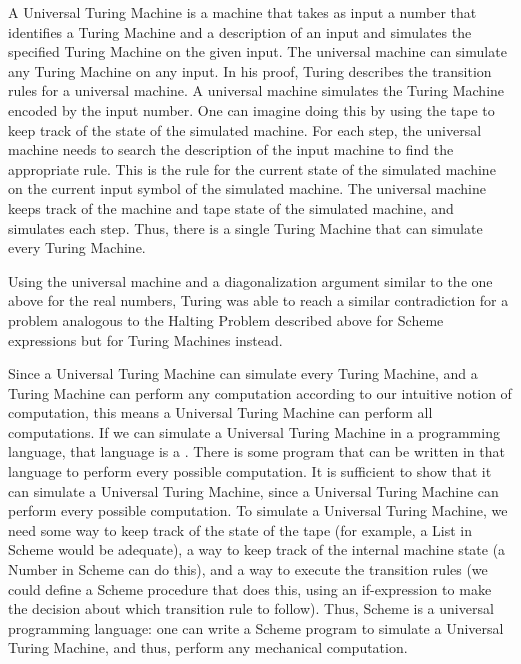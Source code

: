 A Universal Turing Machine is a machine that takes as input a number that identifies a Turing Machine and a description of an input and simulates the specified Turing Machine on the given input.  The universal machine can simulate any Turing Machine on any input.  In his proof, Turing describes the transition rules for a universal machine.  A universal machine simulates the Turing Machine encoded by the input number.  One can imagine doing this by using the tape to keep track of the state of the simulated machine.  For each step, the universal machine needs to search the description of the input machine to find the appropriate rule.  This is the rule for the current state of the simulated machine on the current input symbol of the simulated machine.  The universal machine keeps track of the machine and tape state of the simulated machine, and simulates each step.  Thus, there is a single Turing Machine that can simulate every Turing Machine.

Using the universal machine and a diagonalization argument similar to the one above for the real numbers, Turing was able to reach a similar contradiction for a problem analogous to the Halting Problem described above for Scheme expressions but for Turing Machines instead.

Since a Universal Turing Machine can simulate every Turing Machine, and a Turing Machine can perform any computation according to our intuitive notion of computation, this means a Universal Turing Machine can perform all computations.  If we can simulate a Universal Turing Machine in a programming language, that language is a .  There is some program that can be written in that language to perform every possible computation.  It is sufficient to show that it can simulate a Universal Turing Machine, since a Universal Turing Machine can perform every possible computation.  To simulate a Universal Turing Machine, we need some way to keep track of the state of the tape (for example, a List in Scheme would be adequate), a way to keep track of the internal machine state (a Number in Scheme can do this), and a way to execute the transition rules (we could define a Scheme procedure that does this, using an if-expression to make the decision about which transition rule to follow).  Thus, Scheme is a universal programming language: one can write a Scheme program to simulate a Universal Turing Machine, and thus, perform any mechanical computation.
